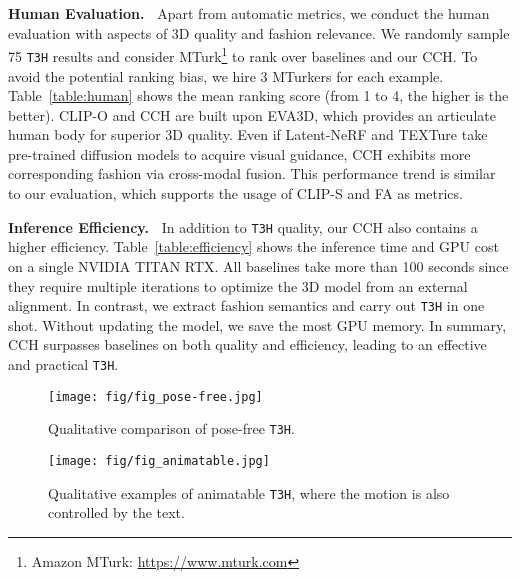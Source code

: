 \documentclass[11pt]{article}
\begin{document}
\vspace{1ex} \noindent \textbf{Human Evaluation.~}
Apart from automatic metrics, we conduct the human evaluation with aspects of 3D quality and fashion relevance. We randomly sample 75 \texttt{T3H} results and consider MTurk\footnote{Amazon MTurk: \url{https://www.mturk.com}} to rank over baselines and our CCH. To avoid the potential ranking bias, we hire 3 MTurkers for each example. Table~\ref{table:human} shows the mean ranking score (from 1 to 4, the higher is the better). CLIP-O and CCH are built upon EVA3D, which provides an articulate human body for superior 3D quality. Even if Latent-NeRF and TEXTure take pre-trained diffusion models to acquire visual guidance, CCH exhibits more corresponding fashion via cross-modal fusion. This performance trend is similar to our evaluation, which supports the usage of CLIP-S and FA as metrics.

\vspace{1ex} \noindent \textbf{Inference Efficiency.~}
In addition to \texttt{T3H} quality, our CCH also contains a higher efficiency. Table~\ref{table:efficiency} shows the inference time and GPU cost on a single NVIDIA TITAN RTX. All baselines take more than 100 seconds since they require multiple iterations to optimize the 3D model from an external alignment. In contrast, we extract fashion semantics and carry out \texttt{T3H} in one shot. Without updating the model, we save the most GPU memory. In summary, CCH surpasses baselines on both quality and efficiency, leading to an effective and practical \texttt{T3H}.

\begin{figure}[t]
\centering
    \texttt{[image: fig/fig\_pose-free.jpg]}
    \vspace{-0.5ex}
    \caption{Qualitative comparison of pose-free \texttt{T3H}.}
    \vspace{-3ex}
    \label{fig:pose-free}
\end{figure}

\begin{figure*}[t]
\centering
    \texttt{[image: fig/fig\_animatable.jpg]}
    \vspace{-3.5ex}
    \caption{Qualitative examples of animatable \texttt{T3H}, where the motion is also controlled by the text.}
    \vspace{-2ex}
    \label{fig:animatable}
\end{figure*}
\end{document}
